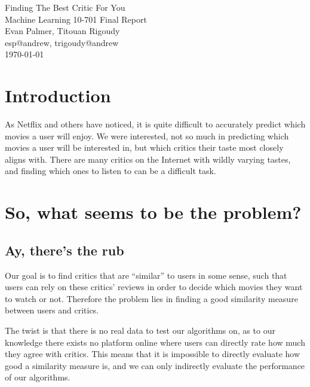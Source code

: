 \documentclass[10.5pt]{article}
\makeatletter
\newcommand{\myname}{Evan Palmer, Titouan Rigoudy}
\newcommand{\myandrew}{esp@andrew, trigoudy@andrew}
\newcommand{\thedate}{\today}
\makeatother
\begin{document}
	\medskip    
	\thispagestyle{plain}
	\begin{center}                 
	{\LARGE Finding The Best Critic For You} \\
	\medskip
	Machine Learning 10-701 Final Report \\
	\smallskip
	\myname \\
	\myandrew \\
	\thedate \\
	\end{center}
	\vspace{0.5cm}

\section{Introduction}

As Netflix and others have noticed, it is quite difficult to accurately predict
which movies a user will enjoy. We were interested, not so much in predicting
which movies a user will be interested in, but which critics their taste most
closely aligns with. There are many critics on the Internet with wildly varying
tastes, and finding which ones to listen to can be a difficult task.



\section{So, what seems to be the problem?}

\subsection{Ay, there's the rub} %

Our goal is to find critics that are ``similar'' to users in some sense, such
that users can rely on these critics' reviews in order to decide which movies
they want to watch or not. Therefore the problem lies in finding a good
similarity measure between users and critics.

The twist is that there is no real data to test our algorithms on, as to our
knowledge there exists no platform online where users can directly rate how
much they agree with critics. This means that it is impossible to directly
evaluate how good a similarity measure is, and we can only indirectly evaluate
the performance of our algorithms.
\end{document}
